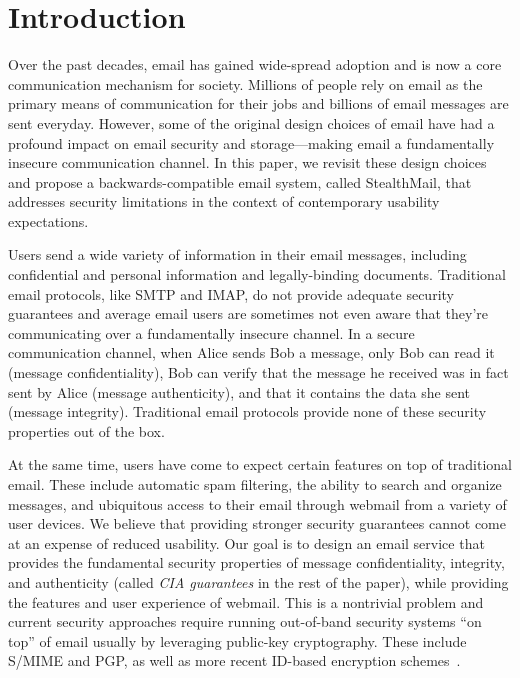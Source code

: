 \section{Introduction}

Over the past decades, email has gained wide-spread adoption 
and is now a core communication mechanism for society. Millions of people rely on email as the primary means of communication for their jobs and billions of email messages are sent everyday. However, 
some of the original design choices of email have had a profound impact 
on email security and storage---making email a fundamentally insecure communication channel. In this paper, we revisit these design choices and propose a backwards-compatible email system, 
called StealthMail, that addresses security limitations in the context of 
contemporary usability expectations.

Users send a wide variety of information in their email messages, 
including confidential and personal information and legally-binding 
documents. Traditional email protocols, like SMTP and IMAP, do not 
provide adequate security guarantees and average email users are 
sometimes not even aware that they're communicating over a fundamentally 
insecure channel. In a secure communication channel, when Alice sends 
Bob a message, only Bob can read it (message confidentiality), Bob can 
verify that the message he received was in fact sent by Alice (message 
authenticity), and that it contains the data she sent (message integrity). 
Traditional email protocols provide none of these security properties 
out of the box. 

At the same time, users have come to expect certain features on top of 
traditional email.  These include automatic spam filtering, the ability 
to search and organize messages, and ubiquitous access to their email 
through webmail from a variety of user devices. We believe that providing 
stronger security guarantees cannot come at an expense of reduced usability. 
Our goal is to design an email service that provides the fundamental 
security properties of message confidentiality, integrity, and authenticity 
(called \emph{CIA guarantees} in the rest of the paper), while providing the 
features and user experience of webmail.  This is a nontrivial problem 
and current security approaches require running out-of-band security 
systems ``on top'' of email usually by leveraging public-key cryptography. 
These include S/MIME and PGP, as well as more recent ID-based encryption 
schemes~\cite{id-based-cryptography}.

